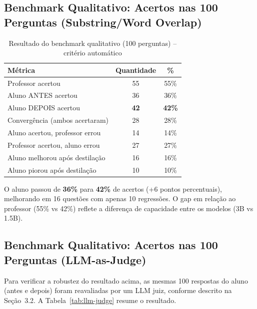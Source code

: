 \documentclass[12pt, a4paper]{article}
\begin{document}
\subsection{Benchmark Qualitativo: Acertos nas 100 Perguntas (Substring/Word Overlap)}

\begin{table}[H]
\centering
\caption{Resultado do benchmark qualitativo (100 perguntas) -- critério automático}
\begin{tabular}{lcc}
\toprule
\textbf{Métrica} & \textbf{Quantidade} & \textbf{\%} \\
\midrule
Professor acertou              & 55 & 55\% \\
Aluno ANTES acertou            & 36 & 36\% \\
\rowcolor{lightgreen}
Aluno DEPOIS acertou           & \textbf{42} & \textbf{42\%} \\
\midrule
Convergência (ambos acertaram) & 28 & 28\% \\
Aluno acertou, professor errou & 14 & 14\% \\
Professor acertou, aluno errou & 27 & 27\% \\
\midrule
\rowcolor{lightgreen}
Aluno melhorou após destilação & 16 & 16\% \\
\rowcolor{lightred}
Aluno piorou após destilação   & 10 & 10\% \\
\bottomrule
\end{tabular}
\end{table}

O aluno passou de \textbf{36\%} para \textbf{42\%} de acertos (+6 pontos percentuais),
melhorando em 16 questões com apenas 10 regressões. O gap em relação ao professor
(55\% vs 42\%) reflete a diferença de capacidade entre os modelos (3B vs 1.5B).

\subsection{Benchmark Qualitativo: Acertos nas 100 Perguntas (LLM-as-Judge)}

Para verificar a robustez do resultado acima, as mesmas 100 respostas do aluno
(antes e depois) foram reavaliadas por um LLM juiz, conforme descrito na
Seção~3.2. A Tabela~\ref{tab:llm-judge} resume o resultado.
\end{document}
